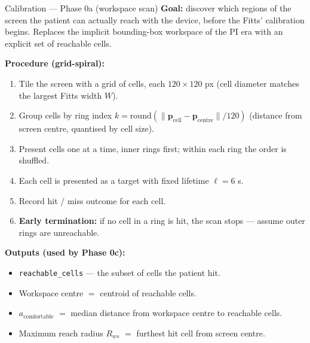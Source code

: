 \documentclass[10pt,aspectratio=169]{beamer}
\begin{document}
\begin{frame}{Calibration --- Phase 0a (workspace scan)}
\textbf{Goal:} discover which regions of the screen the patient can actually reach with the device, before the Fitts' calibration begins. Replaces the implicit bounding-box workspace of the PI era with an explicit set of reachable cells.

\textbf{Procedure (grid-spiral):}
\begin{enumerate}
    \item Tile the screen with a grid of cells, each $120 \times 120$ px (cell diameter matches the largest Fitts width $W$).
    \item Group cells by ring index $k = \mathrm{round}(\|\mathbf{p}_{\text{cell}} - \mathbf{p}_{\text{centre}}\| / 120)$ (distance from screen centre, quantised by cell size).
    \item Present cells one at a time, inner rings first; within each ring the order is shuffled.
    \item Each cell is presented as a target with fixed lifetime $\ell = 6$ s.
    \item Record hit / miss outcome for each cell.
    \item \textbf{Early termination:} if no cell in a ring is hit, the scan stops --- assume outer rings are unreachable.
\end{enumerate}

\textbf{Outputs (used by Phase 0c):}
\begin{itemize}
    \item \texttt{reachable\_cells} --- the subset of cells the patient hit.
    \item Workspace centre $=$ centroid of reachable cells.
    \item $a_{\text{comfortable}}$ $=$ median distance from workspace centre to reachable cells.
    \item Maximum reach radius $R_{ws}$ $=$ furthest hit cell from screen centre.
\end{itemize}
\end{frame}
\end{document}
